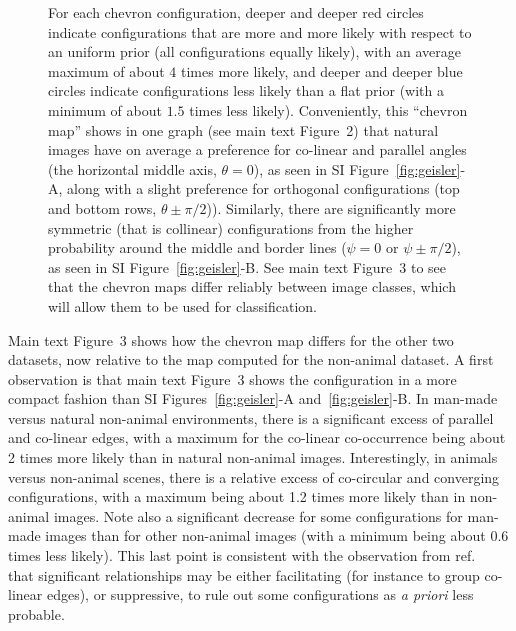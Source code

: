\documentclass[a4paper]{article}
\begin{document}
\begin{figure}[!htb]
{{For each chevron configuration, deeper and deeper red circles 
indicate configurations that are more and more likely 
with respect to an uniform prior (all configurations equally likely), 
with an average maximum of about $4$ times more likely, 
and deeper and deeper blue circles indicate configurations less likely 
than a flat prior (with a minimum of about $1.5$ times less likely). 
Conveniently, this ``chevron map'' shows in one graph (see  main text Figure~2)
that natural images 
have on average a preference for co-linear and parallel angles
(the horizontal middle axis, $\theta=0$), as seen in SI Figure~\ref{fig:geisler}-A, 
along with a slight preference for orthogonal configurations (top and bottom rows, $\theta \pm \pi/2$)).
Similarly, there are significantly more symmetric (that is collinear) configurations 
from the higher probability 
around the middle and border lines ($\psi =0$ or $\psi \pm \pi/2$),
as seen in SI Figure~\ref{fig:geisler}-B.
See main text Figure~3 %
to see that the chevron maps 
differ reliably between image classes, 
which will allow them to be used for classification.
}
\label{fig:chevrons}}%
\end{figure}%

Main text Figure~3 %
shows how the chevron map differs 
for the other two datasets, now relative to the map computed for the non-animal dataset. 
A first observation is that main text Figure~3 %
shows the configuration in a more compact fashion than SI Figures~\ref{fig:geisler}-A and~\ref{fig:geisler}-B. 
In man-made versus natural non-animal environments, 
there is a significant excess of parallel and co-linear edges, 
with a maximum for the co-linear co-occurrence being about 2 times more likely than in natural non-animal images.
Interestingly, in animals versus non-animal scenes, 
there is a relative excess of co-circular and converging configurations, 
with a maximum being about 1.2 times more likely than in non-animal images. 
Note also a significant decrease for some configurations for man-made images 
than for other non-animal images (with a minimum being about 0.6 times less likely). 
This last point is consistent with the observation from ref.~\autocite{Hunt11}
that significant relationships may be either facilitating (for instance to group co-linear edges), 
or suppressive, to rule out some configurations as \textit{a priori} less probable.
\end{document}
